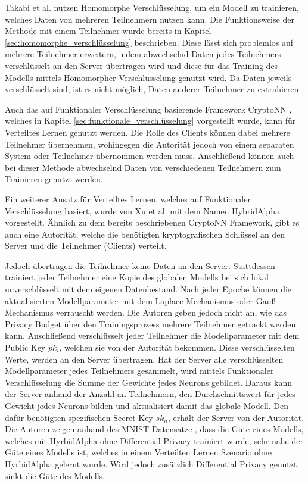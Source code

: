 Takabi et al. \cite{P-104} nutzen Homomorphe Verschlüsselung, um ein Modell zu trainieren, welches Daten von mehreren Teilnehmern nutzen kann. 
Die Funktionsweise der Methode mit einem Teilnehmer wurde bereits in Kapitel \ref{sec:homomorphe_verschlüsselung} beschrieben.
Diese lässt sich problemlos auf mehrere Teilnehmer erweitern, indem abwechselnd Daten jedes Teilnehmers verschlüsselt an den Server übertragen wird und diese für das Training des Modells mittels Homomorpher Verschlüsselung genutzt wird.
Da Daten jeweils verschlüsselt sind, ist es nicht möglich, Daten anderer Teilnehmer zu extrahieren.

Auch das auf Funktionaler Verschlüsselung basierende Framework CryptoNN \cite{P-53}, welches in Kapitel \ref{sec:funktionale_verschlüsselung} vorgestellt wurde, kann für Verteiltes Lernen genutzt werden. 
Die Rolle des Clients können dabei mehrere Teilnehmer übernehmen, wohingegen die Autorität jedoch von einem separaten System oder Teilnehmer übernommen werden muss. 
Anschließend können auch bei dieser Methode abwechselnd Daten von verschiedenen Teilnehmern zum Trainieren genutzt werden.


Ein weiterer Ansatz für Verteiltes Lernen, welches auf Funktionaler Verschlüsselung basiert, wurde von Xu et al. \cite{P-33} mit dem Namen HybridAlpha vorgestellt.
Ähnlich zu dem bereits beschriebenen CryptoNN Framework, gibt es auch eine Autorität, welche die benötigten kryptografischen Schlüssel an den Server und die Teilnehmer (Clients) verteilt.

Jedoch übertragen die Teilnehmer keine Daten an den Server.
Stattdessen trainiert jeder Teilnehmer eine Kopie des globalen Modells bei sich lokal unverschlüsselt mit dem eigenen Datenbestand.
Nach jeder Epoche können die aktualisierten Modellparameter mit dem Laplace-Mechanismus oder Gauß-Mechanismus verrauscht werden.
Die Autoren geben jedoch nicht an, wie das Privacy Budget über den Trainingsprozess mehrere Teilnehmer getrackt werden kann.
Anschließend verschlüsselt jeder Teilnehmer die Modellparameter mit dem Public Key $pk_i$, welchen sie von der Autorität bekommen.
Diese verschlüsselten Werte, werden an den Server übertragen.
Hat der Server alle verschlüsselten Modellparameter jedes Teilnehmers gesammelt, wird mittels Funktionaler Verschlüsselung die Summe der Gewichte jedes Neurons gebildet.
Daraus kann der Server anhand der Anzahl an Teilnehmern, den Durchschnittswert für jedes Gewicht jedes Neurons bilden und aktualisiert damit das globale Modell.
Den dafür benötigten spezifischen Secret Key $sk_n$, erhält der Server von der Autorität.
Die Autoren zeigen anhand des MNIST Datensatze \cite{D-MNIST}, dass die Güte eines Modells, welches mit HyrbidAlpha ohne Differential Privacy trainiert wurde, sehr nahe der Güte eines Modells ist, welches in einem Verteilten Lernen Szenario ohne HyrbidAlpha gelernt wurde. 
Wird jedoch zusätzlich Differential Privacy genutzt, sinkt die Güte des Modells. 


